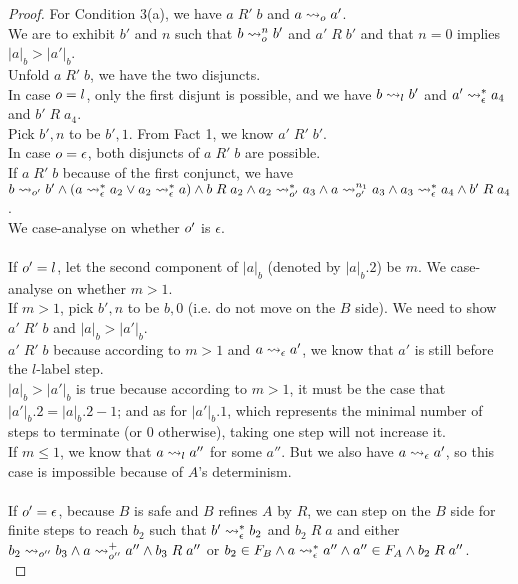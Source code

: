 \begin{proof}
  For Condition 3(a), we have $a\;R'\;b$ and $a\leadsto_o a'$. \\
  We are to exhibit $b'$ and $n$ such that $b\leadsto^n_o b'$ and $a'\;R\;b'$ and that $n=0$ implies $|a|_b>|a'|_b$. \\
  Unfold $a\;R'\;b$, we have the two disjuncts. \\
  In case $o=l$, only the first disjunt is possible, and we have $b\leadsto_l b'$ and $a'\leadsto^*_\epsilon a_4$ and $b'\;R\;a_4$. \\
  Pick $b',n$ to be $b',1$. From Fact 1, we know $a'\;R'\;b'$. \\
  In case $o=\epsilon$, both disjuncts of $a\;R'\;b$ are possible. \\
  If $a\;R'\;b$ because of the first conjunct, we have $b\leadsto_{o'} b'\wedge (a\leadsto^*_\epsilon a_2\vee a_2\leadsto^*_\epsilon a)\wedge b\;R\;a_2\wedge a_2\leadsto^*_{o'} a_3\wedge a\leadsto^{n_1}_{o'} a_3\wedge a_3\leadsto^*_\epsilon a_4\wedge b'\;R\;a_4$. \\
  We case-analyse on whether $o'$ is $\epsilon$. \\
  \\
  If $o'=l$, let the second component of $|a|_b$ (denoted by $|a|_b.2$) be $m$. We case-analyse on whether $m>1$. \\
  If $m>1$, pick $b',n$ to be $b, 0$ (i.e. do not move on the $B$ side). We need to show $a'\;R'\;b$ and $|a|_b>|a'|_b$. \\
  $a'\;R'\;b$ because according to $m>1$ and $a\leadsto_\epsilon a'$, we know that $a'$ is still before the $l$-label step. \\
  $|a|_b>|a'|_b$ is true because according to $m>1$, it must be the case that $|a'|_b.2=|a|_b.2-1$; and as for $|a'|_b.1$, which represents the minimal number of steps to terminate (or 0 otherwise), taking one step will not increase it. \\
  If $m\leq 1$, we know that $a\leadsto_l a''$ for some $a''$. But we also have $a\leadsto_\epsilon a'$, so this case is impossible because of $A$'s determinism. \\
  \\
  If $o'=\epsilon$, because $B$ is safe and $B$ refines $A$ by $R$, we can step on the $B$ side for finite steps to reach $b_2$ such that $b'\leadsto^*_\epsilon b_2$ and $b_2\;R\;a$ and either $b_2\leadsto_{o''} b_3\wedge a\leadsto^+_{o''}a''\wedge b_3\;R\;a''$ or $b_2\in F_B\wedge a\leadsto^*_\epsilon a''\wedge a''\in F_A\wedge b_2\;R\;a''$. \\

\end{proof}
